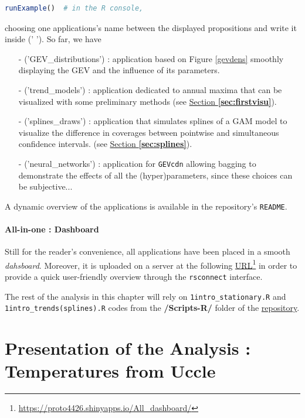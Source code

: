 \begin{center}
\begin{lstlisting}[language=R]
runExample()  # in the R console,
\end{lstlisting}
\end{center}
choosing one applications's name between the displayed propositions and write it inside (' ').
So far, we have
\begin{itemize}
	\item[-]('GEV\_distributions') :  application based on Figure \ref{gevdens} smoothly displaying the GEV and the influence of its parameters.
	
	\item[-] ('trend\_models') :
	application dedicated to annual maxima that can be visualized with some preliminary methods (see \hyperref[sec:firstvisu]{Section \textbf{\ref{sec:firstvisu}}}).
	
	\item[-] ('splines\_draws') : application that simulates splines of a GAM model to visualize the difference in coverages between pointwise and simultaneous confidence intervals. (see \hyperref[sec:splines]{Section \textbf{\ref{sec:splines}}}).

	\item[-] ('neural\_networks') : 
	application for \texttt{GEVcdn} allowing bagging to demonstrate the effects of all the (hyper)parameters, since these choices can be subjective...
\end{itemize}
A dynamic overview of the applications is available in the repository's \texttt{README}.

\paragraph*{All-in-one : Dashboard} 
Still for the reader's convenience, all applications have been placed in a smooth \emph{dahsboard}. Moreover, it is uploaded on a server at the following \href{https://proto4426.shinyapps.io/All\_dashboard/}{URL}\footnote{\url{https://proto4426.shinyapps.io/All\_dashboard/}}
 in order to provide a quick user-friendly overview through the \texttt{rsconnect} interface.
 
The rest of the analysis in this chapter will rely on \texttt{1intro\_stationary.R} and \\ \texttt{1intro\_trends(splines).R} codes from the \textbf{/Scripts-R/} folder of the \href{https://github.com/proto4426/PissoortThesis}{repository}.


\section{Presentation of the Analysis : Temperatures from Uccle}\label{sec:presuccle}

